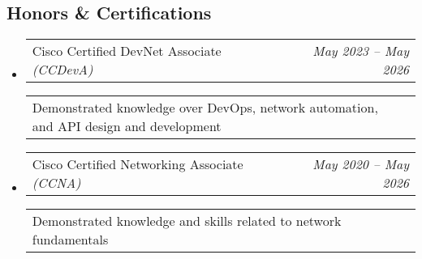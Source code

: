 \documentclass[10pt,letterpaper]{article}
\makeatletter
\newcommand{\headerrow}[2]
{\begin{tabular*}{\linewidth}{l@{\extracolsep{\fill}}r}
	#1 &
	#2 \\
\end{tabular*}}
\makeatother
\begin{document}
\subsection*{Honors \& Certifications}
\begin{itemize}
    \item 
        \headerrow
        {Cisco Certified DevNet Associate \emph{(CCDevA)}}
	    {\emph{May 2023 -- May 2026}}
	    \headerrow
	    {Demonstrated knowledge over DevOps, network automation, and API design and development}
	    {}
    \item 
        \headerrow
	    {Cisco Certified Networking Associate \emph{(CCNA)}}
	    {\emph{May 2020 -- May 2026}}
	    \headerrow
	    {Demonstrated knowledge and skills related to network fundamentals}
	    {}
\end{itemize}
\end{document}
